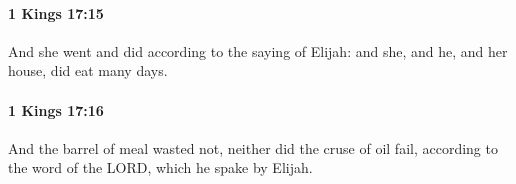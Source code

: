 		\paragraph{1 Kings 17:15} %
			\label{1KINGS-17-15}

			And she went and did according to the saying of Elijah: and she, and he, and her house, did eat many days.


		\paragraph{1 Kings 17:16} %
			\label{1KINGS-17-16}

			And the barrel of meal wasted not, neither did the cruse of oil fail, according to the word of the LORD, which he spake by Elijah.


